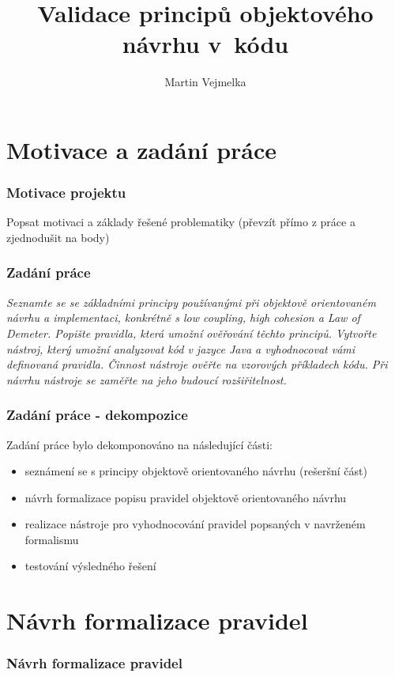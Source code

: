 \documentclass{beamer}
\title{Validace principů objektového návrhu v~kódu}
\author{Martin Vejmelka}
\begin{document}
\begin{frame}
  \titlepage
\end{frame}

\begin{frame}
  \tableofcontents
\end{frame}

\section{Motivace a zadání práce}
\begin{frame}
\frametitle{Motivace projektu}
    Popsat motivaci a základy řešené problematiky (převzít přímo z práce a zjednodušit na body)
\end{frame}

\begin{frame}
\frametitle{Zadání práce}
\textit{Seznamte se se základními principy používanými při objektově orientovaném návrhu a implementaci, konkrétně s low coupling, high cohesion a Law of Demeter. Popište pravidla, která umožní ověřování těchto principů. Vytvořte nástroj, který umožní analyzovat kód v jazyce Java a vyhodnocovat vámi definovaná pravidla. Činnost nástroje ověřte na vzorových příkladech kódu. Při návrhu nástroje se zaměřte na jeho budoucí rozšiřitelnost.}
\end{frame}

\begin{frame}
\frametitle{Zadání práce - dekompozice}
Zadání práce bylo dekomponováno na následující části:

\begin{itemize}
\item seznámení se s principy objektově orientovaného návrhu (rešeršní část)
\item návrh formalizace popisu pravidel objektově orientovaného návrhu
\item realizace nástroje pro vyhodnocování pravidel popsaných v navrženém formalismu
\item testování výsledného řešení
\end{itemize}

\end{frame}

\section{Návrh formalizace pravidel}
\begin{frame}
\frametitle{Návrh formalizace pravidel}
\end{frame}
\end{document}
